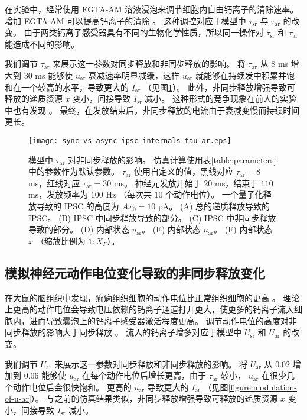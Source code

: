 在实验中，经常使用 EGTA-AM 溶液浸泡来调节细胞内自由钙离子的清除速率。
增加 EGTA-AM 可以提高钙离子的清除 \cite{Otsu2004,Jiang2015}。
这种调控对应于模型中 $\tau_\text{sr}$ 与 $\tau_\text{ar}$ 的改变。
由于两类钙离子感受器具有不同的生物化学性质，所以同一操作对 $\tau_\text{sr}$ 和 $\tau_\text{ar}$ 能造成不同的影响。

我们调节 $\tau_\text{ar}$ 来展示这一参数对同步释放和非同步释放的影响。
将 $\tau_\text{ar}$ 从 $8$ ms 增大到 $30$ ms 能够使 $u_\text{ar}$ 衰减速率明显减缓，这样 $u_\text{ar}$ 就能够在持续发中积累并饱和在一个较高的水平，导致更大的 $I_\text{ar}$ （见图\ref{figure:modulation-of-tau-ar}）。
此外，非同步释放增强导致可释放的递质资源 $x$ 变小，间接导致 $I_\text{sr}$ 减小。
这种形式的竞争现象在前人的实验中也有发现 \cite{Otsu2004}。
最终，在发放结束后，非同步释放的电流由于衰减变慢而持续时间更长。

 
\begin{figure}
\texttt{[image: sync-vs-async-ipsc-internals-tau-ar.eps]}
\caption{模型中 $\tau_\text{ar}$ 对非同步释放的影响。
仿真计算使用表\ref{table:parameters}中的参数作为默认参数。
$\tau_\text{ar}$ 使用自定义的值，黑线对应 $\tau_\text{ar} = 8$ ms，红线对应 $\tau_\text{ar} = 30$ ms。
神经元发放开始于 $20$ ms，结束于 $110$ ms，发放频率为 $100$ Hz （每次共 $10$ 个动作电位）。
一个量子化释放导致的 IPSC 的高度为 $Ax_0 = 10$ pA。
(A) 总的递质释放导致的 IPSC。
(B) IPSC 中同步释放导致的部分。
(C) IPSC 中非同步释放导致的部分。
(D) 内部状态 $u_\text{sr}$。
(E) 内部状态 $u_\text{ar}$。
(F) 内部状态 $x$ （缩放比例为 $1:X_F$）。}
\label{figure:modulation-of-tau-ar}
\end{figure}


\subsection{模拟神经元动作电位变化导致的非同步释放变化}
\label{section:result:modulate-with-u-ar}
在大鼠的脑组织中发现，癫痫组织细胞的动作电位比正常组织细胞的更高 \cite{Jiang2012}。
理论上更高的动作电位会导致电压依赖的钙离子通道打开更大，使更多的钙离子流入细胞内，进而导致囊泡上的钙离子感受器激活程度更高。
调节动作电位的高度对非同步释放的影响大于同步释放 \cite{Jiang2012}。
流入的钙离子增多对应于模型中 $U_\text{sr}$ 和 $U_\text{ar}$ 的改变。

我们调节 $U_\text{ar}$ 来展示这一参数对同步释放和非同步释放的影响。
将 $U_\text{ar}$ 从 $0.02$ 增加到 $0.06$ 能够使 $u_\text{ar}$ 在每个动作电位后增长更高，由于 $\tau_\text{ar}$ 较小， $u_\text{ar}$ 在很少几个动作电位后会很快饱和。
更高的 $u_\text{ar}$ 导致更大的 $I_\text{ar}$ （见图\ref{figure:modulation-of-u-ar}）。
与之前的仿真结果类似，非同步释放增强导致可释放的递质资源 $x$ 变小，间接导致 $I_\text{sr}$ 减小。
 
